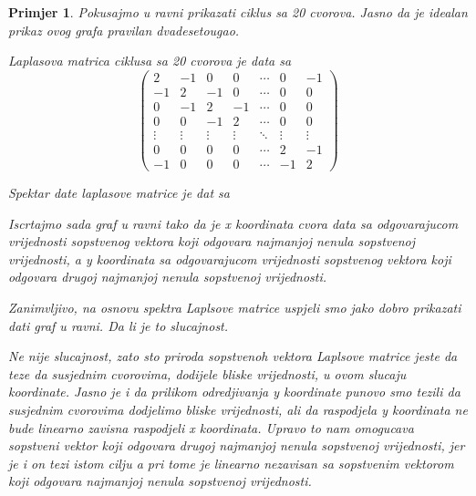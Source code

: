 \documentclass[11pt]{article}
\newtheorem{example}{Primjer}
\begin{document}
	\begin{example}
		Pokusajmo u ravni prikazati ciklus sa 20 cvorova. Jasno da je idealan prikaz ovog grafa pravilan dvadesetougao.

		Laplasova matrica ciklusa sa 20 cvorova je data sa
		\[
			\begin{pmatrix}
				2 & -1 & 0 & 0 & \cdots & 0 & -1 \\
				-1 & 2 & -1 & 0 & \cdots & 0 & 0 \\
				0 & -1 & 2 & -1 & \cdots & 0 & 0 \\
				0 & 0 & -1 & 2 & \cdots & 0 & 0 \\
				\vdots & \vdots & \vdots & \vdots & \ddots & \vdots & \vdots \\
				0 & 0 & 0 & 0 & \cdots & 2 & -1 \\
				-1 & 0 & 0 & 0 & \cdots & -1 & 2
			  \end{pmatrix}	
		\]

		Spektar date laplasove matrice je dat sa
		\[
		\]

		Iscrtajmo sada graf u ravni tako da je x koordinata cvora data sa odgovarajucom vrijednosti sopstvenog vektora koji odgovara najmanjoj nenula sopstvenoj vrijednosti, a y koordinata sa odgovarajucom vrijednosti sopstvenog vektora koji odgovara drugoj najmanjoj nenula sopstvenoj vrijednosti.
		

		Zanimvljivo, na osnovu spektra Laplsove matrice uspjeli smo jako dobro prikazati dati graf u ravni. Da li je to slucajnost.

		Ne nije slucajnost, zato sto priroda sopstvenoh vektora Laplsove matrice jeste da teze da susjednim cvorovima, dodijele bliske vrijednosti, u ovom slucaju koordinate. Jasno je i da prilikom odredjivanja y koordinate punovo smo tezili da susjednim cvorovima dodjelimo bliske vrijednosti, ali da raspodjela y koordinata ne bude linearno zavisna raspodjeli x koordinata.
		Upravo to nam omogucava sopstveni vektor koji odgovara drugoj najmanjoj nenula sopstvenoj vrijednosti, jer je i on tezi istom cilju a pri tome je linearno nezavisan sa sopstvenim vektorom koji odgovara najmanjoj nenula sopstvenoj vrijednosti.

	\end{example}

	
\end{document}
